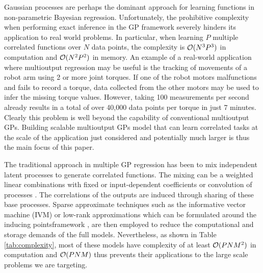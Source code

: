 Gaussian processes \citep[GPs,][]{rasmussen-williams-book} are perhaps the dominant approach for learning functions in non-parametric Bayesian regression.
Unfortunately, the prohibitive complexity when performing exact inference in the GP framework severely hinders its application to real world problems. 
In particular, when learning $P$ multiple correlated functions over $N$ data points, the complexity is $\mathcal{O}(N^3P^3)$ in computation and $\mathcal{O}(N^2P^2)$ in memory.
An example of a real-world application where multioutput regression may be useful is the tracking of  movements of a robot arm using 2 or more joint torques. 
If one of the robot motors malfunctions and fails to record a torque, data collected from the other motors may be used to infer the missing torque values.
However, taking 100 measurements per second already results in a total of over 40,000 data points per torque in just 7 minutes.
Clearly this problem is well beyond the capability of conventional multioutput GPs.
Building scalable multioutput GPs model that can learn correlated tasks at the scale of the application just considered and potentially much larger is thus the main focus of this paper.

The traditional approach in multiple GP regression has been to mix independent latent processes to generate correlated functions.
The mixing can be a weighted linear combinations with fixed \citep{teh-et-al-aistats-05,bonilla-et-al-nips-08} or input-dependent \citep{wilson-et-al-icml-12,nguyen2013efficient} coefficients or convolution of processes \citep{boyle-frean-nips-05,alvarez-lawrence-nips-08}.
The correlations of the outputs are induced through sharing of these base processes.
Sparse approximate techniques such as the informative vector machine (IVM) \cite{lawrence2002fast} or low-rank approximations which can be formulated around the inducing pointsframework \citep{quinonero2005unifying},
are then employed to reduce the computational and storage demands of the full models.
Nevertheless, as shown in Table \ref{tab:complexity}, most of these models have complexity of at least $\mathcal{O}(PNM^2)$ in computation and $\mathcal{O}(PNM)$ thus prevents their applications to the  large scale problems we are targeting.

